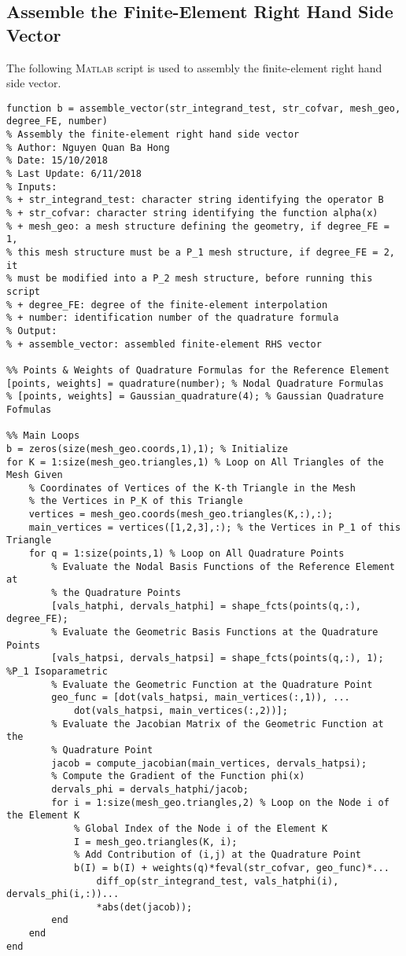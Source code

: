 \documentclass[11pt,a4paper,center,notitlepage]{article}
\numberwithin{equation}{section}
\begin{document}
\subsection{Assemble the Finite-Element Right Hand Side Vector}\label{sec8.6}
The following \textsc{Matlab} script is used to assembly the finite-element right hand side vector.
\begin{verbatim}
function b = assemble_vector(str_integrand_test, str_cofvar, mesh_geo, degree_FE, number)
% Assembly the finite-element right hand side vector
% Author: Nguyen Quan Ba Hong
% Date: 15/10/2018
% Last Update: 6/11/2018
% Inputs:
% + str_integrand_test: character string identifying the operator B
% + str_cofvar: character string identifying the function alpha(x)
% + mesh_geo: a mesh structure defining the geometry, if degree_FE = 1,
% this mesh structure must be a P_1 mesh structure, if degree_FE = 2, it
% must be modified into a P_2 mesh structure, before running this script
% + degree_FE: degree of the finite-element interpolation
% + number: identification number of the quadrature formula
% Output:
% + assemble_vector: assembled finite-element RHS vector

%% Points & Weights of Quadrature Formulas for the Reference Element
[points, weights] = quadrature(number); % Nodal Quadrature Formulas
% [points, weights] = Gaussian_quadrature(4); % Gaussian Quadrature Fofmulas

%% Main Loops
b = zeros(size(mesh_geo.coords,1),1); % Initialize
for K = 1:size(mesh_geo.triangles,1) % Loop on All Triangles of the Mesh Given
    % Coordinates of Vertices of the K-th Triangle in the Mesh
    % the Vertices in P_K of this Triangle
    vertices = mesh_geo.coords(mesh_geo.triangles(K,:),:); 
    main_vertices = vertices([1,2,3],:); % the Vertices in P_1 of this Triangle
    for q = 1:size(points,1) % Loop on All Quadrature Points
        % Evaluate the Nodal Basis Functions of the Reference Element at 
        % the Quadrature Points
        [vals_hatphi, dervals_hatphi] = shape_fcts(points(q,:), degree_FE);
        % Evaluate the Geometric Basis Functions at the Quadrature Points
        [vals_hatpsi, dervals_hatpsi] = shape_fcts(points(q,:), 1); %P_1 Isoparametric
        % Evaluate the Geometric Function at the Quadrature Point
        geo_func = [dot(vals_hatpsi, main_vertices(:,1)), ...
            dot(vals_hatpsi, main_vertices(:,2))];
        % Evaluate the Jacobian Matrix of the Geometric Function at the 
        % Quadrature Point
        jacob = compute_jacobian(main_vertices, dervals_hatpsi);
        % Compute the Gradient of the Function phi(x)
        dervals_phi = dervals_hatphi/jacob;
        for i = 1:size(mesh_geo.triangles,2) % Loop on the Node i of the Element K
            % Global Index of the Node i of the Element K
            I = mesh_geo.triangles(K, i); 
            % Add Contribution of (i,j) at the Quadrature Point
            b(I) = b(I) + weights(q)*feval(str_cofvar, geo_func)*...
                diff_op(str_integrand_test, vals_hatphi(i), dervals_phi(i,:))...
                *abs(det(jacob));
        end
    end
end
\end{verbatim}
\end{document}
